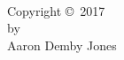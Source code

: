 \chapter*{}
\null
\vfill
\begin{center}
  \thetitle\\[2ex]
  Copyright \copyright \ 2017\\
  by\\
  Aaron Demby Jones
\end{center}
